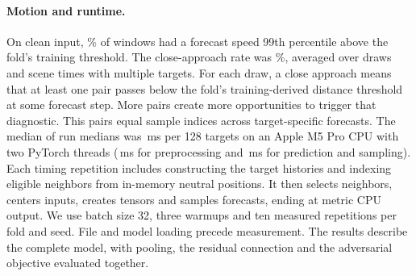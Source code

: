 \paragraph{Motion and runtime.}
On clean input, \% of windows
had a forecast speed 99th percentile above the fold's training threshold.
The close-approach rate was \%,
averaged over draws and scene times with multiple targets.
For each draw, a close approach means that at least one pair passes below
the fold's training-derived distance threshold at some forecast step.
More pairs create more opportunities to trigger that diagnostic. This pairs
equal sample indices across target-specific forecasts. The median of run
medians was \,ms
per 128 targets on an Apple M5 Pro CPU with two PyTorch threads
(\,ms for preprocessing and
\,ms for prediction and sampling).
Each timing repetition includes constructing the target histories and
indexing eligible neighbors from in-memory neutral positions. It then
selects neighbors, centers inputs, creates tensors and samples forecasts,
ending at metric CPU output. We use batch size 32, three warmups and ten
measured repetitions per fold and seed. File and model loading precede
measurement. The results describe the complete model, with pooling, the
residual connection and the adversarial objective evaluated together.


